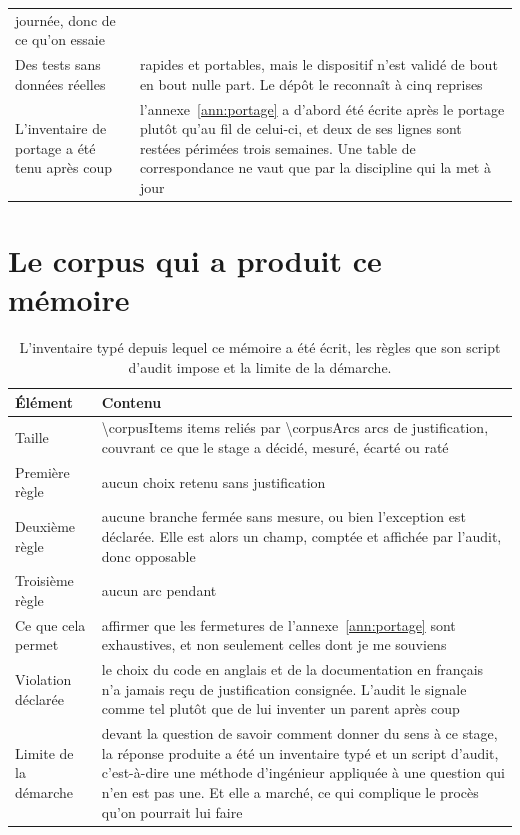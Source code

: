 \begin{table}[H]
\begin{tabularx}{\textwidth}{@{}p{34mm}X@{}}
      journée, donc de ce qu'on essaie \\
    Des tests sans données réelles &
      rapides et portables, mais le dispositif n'est validé de bout en bout nulle part. Le
      dépôt le reconnaît à cinq reprises \\
    L'inventaire de portage a été tenu après coup &
      l'annexe~\ref{ann:portage} a d'abord été écrite après le portage plutôt qu'au fil de
      celui-ci, et deux de ses lignes sont restées périmées trois semaines. Une table de
      correspondance ne vaut que par la discipline qui la met à jour \\
    \bottomrule
  \end{tabularx}
\end{table}

\section{Le corpus qui a produit ce mémoire}

\begin{table}[H]
  \centering
  \caption{L'inventaire typé depuis lequel ce mémoire a été écrit, les règles que son script
  d'audit impose et la limite de la démarche.}
  \label{tab:ann-corpus}
  \scriptsize
  \setlength{\tabcolsep}{4pt}
  \begin{tabularx}{\textwidth}{@{}p{34mm}X@{}}
    \toprule
    \textbf{Élément} & \textbf{Contenu} \\
    \midrule
    Taille & \num{\corpusItems} items reliés par \num{\corpusArcs} arcs de justification,
      couvrant ce que le stage a décidé, mesuré, écarté ou raté \\
    Première règle & aucun choix retenu sans justification \\
    Deuxième règle & aucune branche fermée sans mesure, ou bien l'exception est déclarée. Elle
      est alors un champ, comptée et affichée par l'audit, donc opposable \\
    Troisième règle & aucun arc pendant \\
    Ce que cela permet & affirmer que les fermetures de l'annexe~\ref{ann:portage} sont
      exhaustives, et non seulement celles dont je me souviens \\
    Violation déclarée & le choix du code en anglais et de la documentation en français n'a
      jamais reçu de justification consignée. L'audit le signale comme tel plutôt que de lui
      inventer un parent après coup \\
    Limite de la démarche & devant la question de savoir comment donner du sens à ce stage, la
      réponse produite a été un inventaire typé et un script d'audit, c'est-à-dire une méthode
      d'ingénieur appliquée à une question qui n'en est pas une. Et elle a marché, ce qui
      complique le procès qu'on pourrait lui faire \\
    \bottomrule
  \end{tabularx}
\end{table}
